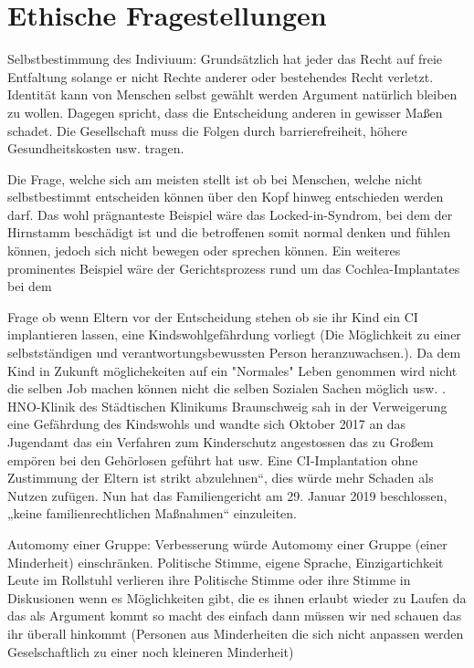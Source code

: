 \documentclass[a4paper,
DIV=13,
12pt,
BCOR=10mm,
department=FakEI,
twoside,
parskip=half,
automark,
]{OTHRartcl}
\begin{document}
\section*{Ethische Fragestellungen}

Selbstbestimmung des Indiviuum: Grundsätzlich hat jeder das Recht auf freie Entfaltung solange er nicht Rechte anderer oder bestehendes Recht verletzt\cite{fur1996grundgesetz}. Identität kann von Menschen selbst gewählt werden
Argument natürlich bleiben zu wollen. \cite{lee2016cochlear} Dagegen spricht, dass die Entscheidung anderen in gewisser Maßen schadet. Die Gesellschaft muss die Folgen durch barrierefreiheit, höhere Gesundheitskosten usw. tragen.

Die Frage, welche sich am meisten stellt ist ob bei Menschen, welche nicht selbstbestimmt entscheiden können über den Kopf hinweg entschieden werden darf. Das wohl prägnanteste Beispiel
wäre das Locked-in-Syndrom, bei dem der Hirnstamm beschädigt ist und die betroffenen somit normal denken und fühlen können, jedoch sich nicht bewegen oder sprechen können.\cite{das2022locked}
Ein weiteres prominentes Beispiel wäre der Gerichtsprozess rund um das Cochlea-Implantates bei dem 

Frage ob wenn Eltern vor der Entscheidung stehen ob sie ihr Kind ein CI implantieren lassen, eine Kindswohlgefährdung vorliegt (Die Möglichkeit zu einer selbstständigen und verantwortungsbewussten Person heranzuwachsen.). 
Da dem Kind in Zukunft möglichekeiten auf ein "Normales" Leben genommen wird nicht die selben Job machen können nicht die selben Sozialen Sachen möglich usw. .   HNO-Klinik des Städtischen Klinikums Braunschweig sah in der 
Verweigerung eine Gefährdung des Kindswohls und wandte sich Oktober 2017 an das Jugendamt das ein Verfahren zum Kinderschutz angestossen das zu Großem empören bei 
den Gehörlosen geführt hat usw. Eine CI-Implantation ohne Zustimmung der Eltern ist strikt abzulehnen“, dies würde mehr Schaden als Nutzen zufügen. Nun hat das Familiengericht 
am 29. Januar 2019 beschlossen, „keine familienrechtlichen Maßnahmen“ einzuleiten.


Automomy einer Gruppe: Verbesserung würde Automomy einer Gruppe (einer Minderheit) einschränken. Politische Stimme, eigene Sprache, Einzigartichkeit
Leute im Rollstuhl verlieren ihre Politische Stimme oder ihre Stimme in Diskusionen wenn es Möglichkeiten gibt, die es ihnen erlaubt wieder zu Laufen da das als Argument kommt so macht des einfach dann müssen wir ned schauen das 
ihr überall hinkommt (Personen aus Minderheiten die sich nicht anpassen werden Geselschaftlich zu einer noch kleineren Minderheit) 
\end{document}
